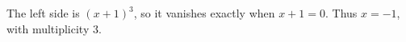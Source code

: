 The left side is $(x+1)^3$, so it vanishes exactly when $x+1=0$. Thus $\boxed{x=-1}$, with multiplicity 3.
